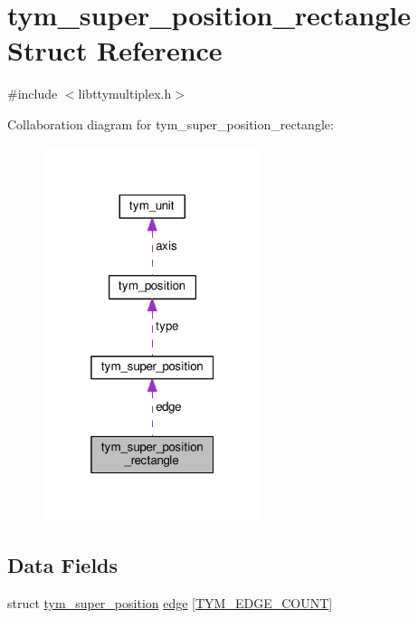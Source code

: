 \hypertarget{structtym__super__position__rectangle}{}\section{tym\+\_\+super\+\_\+position\+\_\+rectangle Struct Reference}
\label{structtym__super__position__rectangle}


{\ttfamily \#include $<$libttymultiplex.\+h$>$}



Collaboration diagram for tym\+\_\+super\+\_\+position\+\_\+rectangle\+:
\nopagebreak
\begin{figure}[H]
\begin{center}
\leavevmode
\includegraphics[width=181pt]{structtym__super__position__rectangle__coll__graph}
\end{center}
\end{figure}
\subsection*{Data Fields}
\begin{DoxyCompactItemize}
\item 
struct \hyperlink{structtym__super__position}{tym\+\_\+super\+\_\+position} \hyperlink{structtym__super__position__rectangle_aab3865c2a42bee957a40c0e8603d5a31}{edge} \mbox{[}\hyperlink{libttymultiplex_8h_ad8856480bf629c72938051528100b834ac0bfa9550b58bc257ca09715d719de7f}{T\+Y\+M\+\_\+\+E\+D\+G\+E\+\_\+\+C\+O\+U\+NT}\mbox{]}
\end{DoxyCompactItemize}


